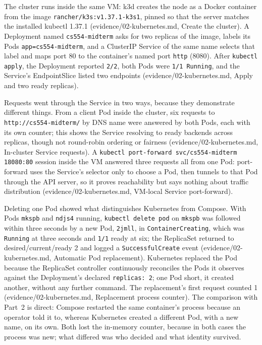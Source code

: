 \documentclass[11pt,letterpaper]{article}
\newcommand{\evid}[2]{\textsf{\footnotesize(evidence/#1, #2)}}
\newcommand{\code}[1]{\texttt{#1}}
\begin{document}
The cluster runs inside the same VM: k3d creates the node as a Docker container from the image \code{rancher/k3s:v1.37.1-k3s1}, pinned so that the server matches the installed kubectl 1.37.1 \evid{02-kubernetes.md}{Create the cluster}. A Deployment named \code{cs554-midterm} asks for two replicas of the image, labels its Pods \code{app=cs554-midterm}, and a ClusterIP Service of the same name selects that label and maps port 80 to the container's named port \code{http} (8080). After \code{kubectl apply}, the Deployment reported \code{2/2}, both Pods were \code{1/1 Running}, and the Service's EndpointSlice listed two endpoints \evid{02-kubernetes.md}{Apply and two ready replicas}.

Requests went through the Service in two ways, because they demonstrate different things. From a client Pod inside the cluster, six requests to \code{http://cs554-midterm/} by DNS name were answered by both Pods, each with its own counter; this shows the Service resolving to ready backends across replicas, though not round-robin ordering or fairness \evid{02-kubernetes.md}{In-cluster Service requests}. A \code{kubectl port-forward svc/cs554-midterm 18080:80} session inside the VM answered three requests all from one Pod: port-forward uses the Service's selector only to choose a Pod, then tunnels to that Pod through the API server, so it proves reachability but says nothing about traffic distribution \evid{02-kubernetes.md}{VM-local Service port-forward}.

Deleting one Pod showed what distinguishes Kubernetes from Compose. With Pods \code{mkspb} and \code{ndjs4} running, \code{kubectl delete pod} on \code{mkspb} was followed within three seconds by a new Pod, \code{2jmll}, in \code{ContainerCreating}, which was \code{Running} at three seconds and \code{1/1} ready at six; the ReplicaSet returned to desired/current/ready 2 and logged a \code{SuccessfulCreate} event \evid{02-kubernetes.md}{Automatic Pod replacement}. Kubernetes replaced the Pod because the ReplicaSet controller continuously reconciles the Pods it observes against the Deployment's declared \code{replicas: 2}; one Pod short, it created another, without any further command. The replacement's first request counted 1 \evid{02-kubernetes.md}{Replacement process counter}. The comparison with Part~2 is direct: Compose restarted the same container's process because an operator told it to, whereas Kubernetes created a different Pod, with a new name, on its own. Both lost the in-memory counter, because in both cases the process was new; what differed was who decided and what identity survived.
\end{document}
